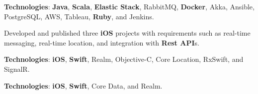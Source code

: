 \documentclass[letterpaper]{deedy-resume} %
\begin{document}
\begin{minipage}[t]{0.64\textwidth}
\textbf{Technologies}: \textbf{Java}, \textbf{Scala}, \textbf{Elastic Stack}, RabbitMQ, \textbf{Docker}, Akka, Ansible, PostgreSQL, AWS, Tableau, \textbf{Ruby}, and Jenkins.


\vspace{4.5mm}


Developed and published three \textbf{iOS} projects with requirements such as real-time messaging, real-time location, and integration with \textbf{Rest API}s.

\vspace{0.5mm}

\textbf{Technologies}: \textbf{iOS}, \textbf{Swift}, Realm, Objective-C, Core Location, RxSwift, and SignalR.


\vspace{4.5mm}



\vspace{0.5mm}

\textbf{Technologies}: \textbf{iOS}, \textbf{Swift}, Core Data, and Realm.

\vspace{4.5mm}

\vspace{0.5mm}


\end{minipage}
\end{document}

